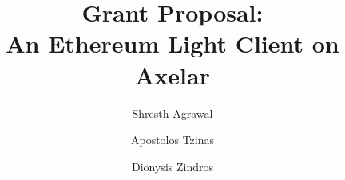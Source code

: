 \title{
  Grant Proposal: \\ An Ethereum Light Client on Axelar
}
\ifanonymous{\iflncs
\author{}\institute{}
\fi}
\else
\author{
   Shresth Agrawal \and
   Apostolos Tzinas \and
   Dionysis Zindros 
}
\iflncs
{}
\else
{}
\fi
\fi
